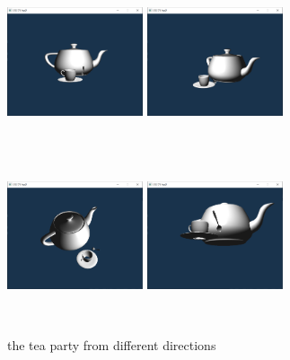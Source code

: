 \documentclass[acmtog]{acmart}
\begin{document}
\begin{figure}[h]
	\centering
	\includegraphics[width=4cm,height=5cm]{1}
	\includegraphics[width=4cm,height=5cm]{2}
	\includegraphics[width=4cm,height=5cm]{3}
	\includegraphics[width=4cm,height=5cm]{4}
	\caption{the tea party from different directions}
\end{figure}
\end{document}
